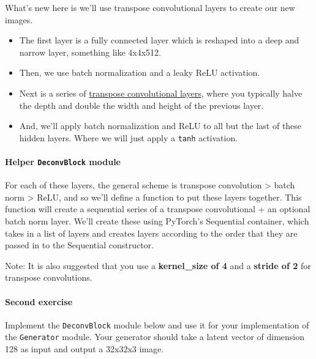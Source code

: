 What's new here is we'll use transpose convolutional layers to create
our new images. 
\begin{itemize}
    \item The first layer is a fully connected layer which is reshaped into a deep and narrow layer, something like 4x4x512.
    \item  Then, we use batch normalization and a leaky ReLU activation.
    \item Next is a series of \href{https://pytorch.org/docs/stable/nn.html\#convtranspose2d}{transpose convolutional layers}, where you typically halve the depth and double the width and height of the previous layer.
    \item And, we'll apply batch normalization and ReLU to all but the last of these hidden layers. Where we will just apply a \lstinline{tanh} activation.
\end{itemize}

\paragraph{\texorpdfstring{Helper \texttt{DeconvBlock}
module}{Helper DeconvBlock module}}

For each of these layers, the general scheme is transpose convolution
> batch norm > ReLU, and so we'll define a
function to put these layers together. This function will create a
sequential series of a transpose convolutional + an optional batch norm
layer. We'll create these using PyTorch's Sequential container, which
takes in a list of layers and creates layers according to the order that
they are passed in to the Sequential constructor.\newline

Note: It is also suggested that you use a \textbf{kernel\_size of 4} and
a \textbf{stride of 2} for transpose convolutions.

\paragraph{Second exercise}

Implement the \lstinline{DeconvBlock} module below and use
it for your implementation of the \lstinline{Generator}
module. Your generator should take a latent vector of dimension 128 as
input and output a 32x32x3 image.


